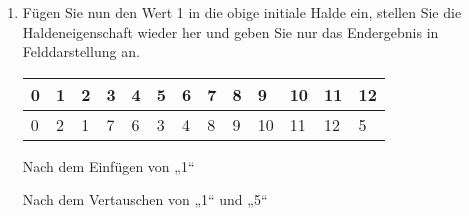 \documentclass{bschlangaul-aufgabe}
\begin{document}
\begin{enumerate}
\begin{bAdditum}[zu b)]
\begin{bBaum}{Nach dem Vertauschen von „12“ und „6“}
\end{bBaum}

\begin{bBaum}{Nach dem Vertauschen von „12“ und „10“}
\end{bBaum}
\end{bAdditum}


\item Fügen Sie nun den Wert 1 in die obige initiale Halde ein, stellen
Sie die Haldeneigenschaft wieder her und geben Sie nur das Endergebnis
in Felddarstellung an.

\begin{bAntwort}
\begin{tabular}{lllllllllllll}
\bf{0}  & \bf{1}  & \bf{2}  & \bf{3}  & \bf{4}  & \bf{5}  & \bf{6}  & \bf{7}  & \bf{8}  & \bf{9}  & \bf{10} & \bf{11} & \bf{12} \\
\hline
0       & 2       & 1       & 7       & 6       & 3       & 4       & 8       & 9       & 10      & 11      & 12      & 5       \\
\end{tabular}
\end{bAntwort}

\begin{bAdditum}[zu c)]

\begin{bBaum}{Nach dem Einfügen von „1“}
\end{bBaum}

\begin{bBaum}{Nach dem Vertauschen von „1“ und „5“}
\end{bBaum}


\end{bAdditum}
\end{enumerate}
\end{document}
